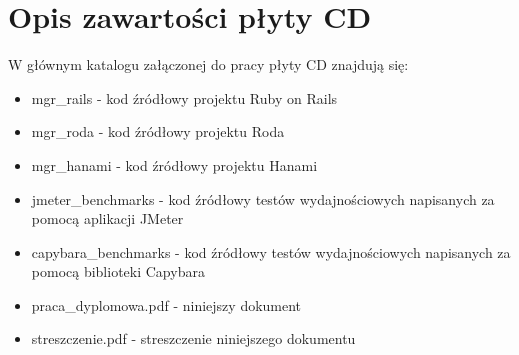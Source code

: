 \documentclass[printmode]{mgr}
\begin{document}
\appendix

\chapter{Opis zawartości płyty CD}
W głównym katalogu załączonej do pracy płyty CD znajdują się:
\begin{itemize}
  \item mgr\_rails - kod źródłowy projektu Ruby on Rails
  \item mgr\_roda - kod źródłowy projektu Roda
  \item mgr\_hanami - kod źródłowy projektu Hanami
  \item jmeter\_benchmarks - kod źródłowy testów wydajnościowych napisanych za pomocą aplikacji JMeter
  \item capybara\_benchmarks - kod źródłowy testów wydajnościowych napisanych za pomocą biblioteki Capybara
  \item praca\_dyplomowa.pdf - niniejszy dokument
  \item streszczenie.pdf - streszczenie niniejszego dokumentu
\end{itemize}
\end{document}
